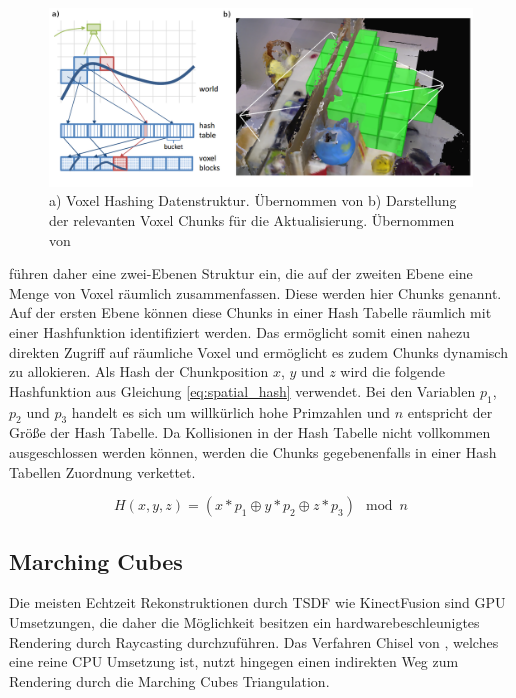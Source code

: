 \begin{figure}[h]
  \centering
	\includegraphics[width=1.0\textwidth]{content/images/methods/hashing.png} 
  \caption{a) Voxel Hashing Datenstruktur. Übernommen von \citet{niessner2013real} b) Darstellung der relevanten Voxel Chunks für die Aktualisierung. Übernommen von \citet{Klingensmith_2015_7924}}
  \label{fig:hashing}
\end{figure}

\citet{niessner2013real} führen daher eine zwei-Ebenen Struktur ein, die auf der zweiten Ebene eine Menge von Voxel räumlich zusammenfassen. Diese werden hier Chunks genannt. Auf der ersten Ebene können diese Chunks in einer Hash Tabelle räumlich mit einer Hashfunktion identifiziert werden. Das ermöglicht somit einen nahezu direkten Zugriff auf räumliche Voxel und ermöglicht es zudem Chunks dynamisch zu allokieren. Als Hash der Chunkposition \(x\), \(y\) und \(z\) wird die folgende Hashfunktion aus Gleichung \ref{eq:spatial_hash} verwendet. Bei den Variablen \(p_1\), \(p_2\) und \(p_3\) handelt es sich um willkürlich hohe Primzahlen und \(n\) entspricht der Größe der Hash Tabelle. Da Kollisionen in der Hash Tabelle nicht vollkommen ausgeschlossen werden können, werden die Chunks gegebenenfalls in einer Hash Tabellen Zuordnung verkettet.

\begin{equation}\label{eq:spatial_hash}
H(x,y,z) = (x * p_1 \oplus y * p_2 \oplus z * p_3) \mod n
\end{equation}

\subsection{Marching Cubes}

Die meisten Echtzeit Rekonstruktionen durch TSDF wie KinectFusion sind GPU Umsetzungen, die daher die Möglichkeit besitzen ein hardwarebeschleunigtes Rendering durch Raycasting durchzuführen. Das Verfahren Chisel von \citet{Klingensmith_2015_7924}, welches eine reine CPU Umsetzung ist, nutzt hingegen einen indirekten Weg zum Rendering durch die Marching Cubes Triangulation. 

